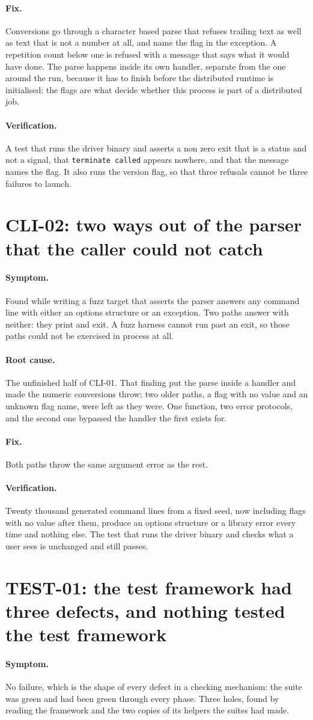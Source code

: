 \documentclass[11pt,a4paper]{report}
\newcommand{\symptom}[1]{\paragraph{Symptom.}#1}
\newcommand{\rootcause}[1]{\paragraph{Root cause.}#1}
\newcommand{\fix}[1]{\paragraph{Fix.}#1}
\newcommand{\verification}[1]{\paragraph{Verification.}#1}
\begin{document}
\fix{Conversions go through a character based parse that refuses trailing text as
well as text that is not a number at all, and name the flag in the exception. A
repetition count below one is refused with a message that says what it would have
done. The parse happens inside its own handler, separate from the one around the
run, because it has to finish before the distributed runtime is initialised: the
flags are what decide whether this process is part of a distributed job.}

\verification{A test that runs the driver binary and asserts a non zero exit that
is a status and not a signal, that \texttt{terminate called} appears nowhere, and
that the message names the flag. It also runs the version flag, so that three
refusals cannot be three failures to launch.}

\section{CLI-02: two ways out of the parser that the caller could not catch}

\symptom{Found while writing a fuzz target that asserts the parser answers any
command line with either an options structure or an exception. Two paths answer
with neither: they print and exit. A fuzz harness cannot run past an exit, so
those paths could not be exercised in process at all.}

\rootcause{The unfinished half of CLI-01. That finding put the parse inside a
handler and made the numeric conversions throw; two older paths, a flag with no
value and an unknown flag name, were left as they were. One function, two error
protocols, and the second one bypassed the handler the first exists for.}

\fix{Both paths throw the same argument error as the rest.}

\verification{Twenty thousand generated command lines from a fixed seed, now
including flags with no value after them, produce an options structure or a
library error every time and nothing else. The test that runs the driver binary
and checks what a user sees is unchanged and still passes.}

\section{TEST-01: the test framework had three defects, and nothing tested the test framework}

\symptom{No failure, which is the shape of every defect in a checking mechanism:
the suite was green and had been green through every phase. Three holes, found by
reading the framework and the two copies of its helpers the suites had made.}
\end{document}
